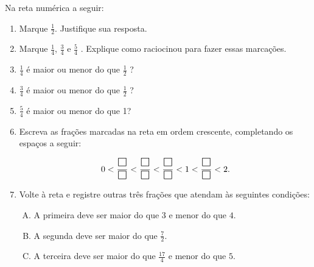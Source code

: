 \begin{atividade}{}


  Na reta numérica a seguir:

  
\begin{center}
\end{center}

\begin{enumerate} [\quad a)] %
  \item     Marque     $\frac{1}{2}$. Justifique sua resposta.
  \item     Marque     $\frac{1}{4}$,     $\frac{3}{4}$     e     $\frac{5}{4}$    . Explique como raciocinou para fazer essas marcações.

  \item $\frac{1}{4}$     é maior ou menor do que     $\frac{1}{2}$    ?
  \item $\frac{3}{4}$ é maior ou menor do que $\frac{1}{2}$    ?
  \item $\frac{5}{4}$   é maior ou menor do que 1?
  \item Escreva as frações marcadas na reta em ordem crescente, completando os espaços a seguir:

$$0 <  \dfrac{\text{\Large $\square$}}{\text{\Large $\square$}} <  \dfrac{\text{\Large $\square$}}{\text{\Large $\square$}} < \dfrac{\text{\Large $\square$}}{\text{\Large $\square$}} < 1 < \dfrac{\text{\Large $\square$}}{\text{\Large $\square$}}< 2.$$

\item Volte à reta e registre outras três frações que atendam às seguintes condições:
  \begin{enumerate}[A)]
  \item A primeira deve ser maior do que $3$ e menor do que $4$.
 \item A segunda deve ser maior do que $\frac{7}{2}$.
 \item A terceira deve ser maior do que $\frac{17}{4}$ e menor do que $5$.
\end{enumerate}
\end{enumerate} %
\end{atividade}

